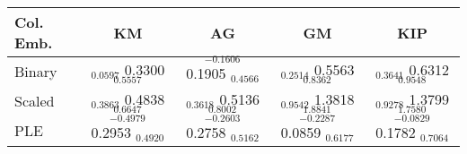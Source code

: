 \begin{tabular}{lcccc}
\toprule
Col. Emb. & KM & AG & GM & KIP \\
\midrule
Binary & $_{0.0597}$ 0.3300 $_{0.5557}$ & $_{-0.1606}$ 0.1905 $_{0.4566}$ & $_{0.2514}$ 0.5563 $_{0.8362}$ & $_{0.3641}$ 0.6312 $_{0.9548}$ \\
Scaled & $_{0.3863}$ 0.4838 $_{0.6647}$ & $_{0.3618}$ 0.5136 $_{0.8002}$ & $_{0.9542}$ 1.3818 $_{1.8841}$ & $_{0.9278}$ 1.3799 $_{1.7580}$ \\
PLE & $_{-0.4979}$ 0.2953 $_{0.4920}$ & $_{-0.2603}$ 0.2758 $_{0.5162}$ & $_{-0.2287}$ 0.0859 $_{0.6177}$ & $_{-0.0829}$ 0.1782 $_{0.7064}$ \\
\bottomrule
\end{tabular}
